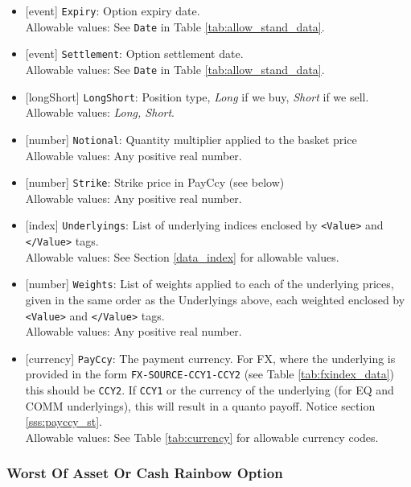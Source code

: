 \begin{itemize}
    \item{}[event] \lstinline!Expiry!: Option expiry date. \\
    Allowable values: See \lstinline!Date! in Table \ref{tab:allow_stand_data}.
    \item{}[event] \lstinline!Settlement!: Option settlement date. \\
    Allowable values: See \lstinline!Date! in Table \ref{tab:allow_stand_data}.
    \item{}[longShort] \lstinline!LongShort!: Position type,
          {\em Long} if we buy, {\em Short} if we sell.\\
    Allowable values: \emph{Long, Short}.
        \item{}[number] \lstinline!Notional!: Quantity multiplier applied to the
          basket price \\
          Allowable values: Any positive real number.
        \item{}[number] \lstinline!Strike!: Strike price in PayCcy (see
          below) \\
          Allowable values: Any positive real number.
    \item{}[index] \lstinline!Underlyings!: List of underlying indices
          enclosed by {\tt <Value>} and {\tt </Value>} tags. \\
          Allowable values: See Section \ref{data_index} for allowable values.
    \item{}[number] \lstinline!Weights!: List of weights applied to each of
          the underlying prices, given in the same order as
          the Underlyings above, each weighted enclosed by {\tt <Value>} and {\tt </Value>} tags.\\
          Allowable values: Any positive real number.
    \item{}[currency] \lstinline!PayCcy!: The payment currency. For FX, where the underlying is provided
      in the form \lstinline!FX-SOURCE-CCY1-CCY2! (see Table \ref{tab:fxindex_data}) this should
      be \lstinline!CCY2!. If \lstinline!CCY1! or the currency of the underlying (for EQ and
      COMM underlyings), this will result in a quanto payoff. Notice section \ref{sss:payccy_st}. \\
        Allowable values: See Table \ref{tab:currency} for allowable currency codes.
\end{itemize}

\subsubsection*{Worst Of Asset Or Cash Rainbow Option}

